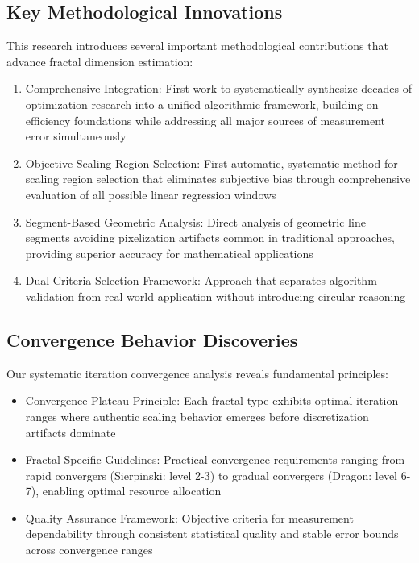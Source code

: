 \documentclass[preprint,12pt]{elsarticle}
\def\textbf#1{#1}%
\begin{document}
\subsection{Key Methodological Innovations}

This research introduces several important methodological contributions that advance fractal dimension estimation:

\begin{enumerate}
\item \textbf{Comprehensive Integration}: First work to systematically synthesize decades of optimization research into a unified algorithmic framework, building on efficiency foundations while addressing all major sources of measurement error simultaneously

\item \textbf{Objective Scaling Region Selection}: First automatic, systematic method for scaling region selection that eliminates subjective bias through comprehensive evaluation of all possible linear regression windows

\item \textbf{Segment-Based Geometric Analysis}: Direct analysis of geometric line segments avoiding pixelization artifacts common in traditional approaches, providing superior accuracy for mathematical applications

\item \textbf{Dual-Criteria Selection Framework}: Approach that separates algorithm validation from real-world application without introducing circular reasoning
\end{enumerate}

\subsection{Convergence Behavior Discoveries}

Our systematic iteration convergence analysis reveals fundamental principles:

\begin{itemize}
\item \textbf{Convergence Plateau Principle}: Each fractal type exhibits optimal iteration ranges where authentic scaling behavior emerges before discretization artifacts dominate

\item \textbf{Fractal-Specific Guidelines}: Practical convergence requirements ranging from rapid convergers (Sierpinski: level 2-3) to gradual convergers (Dragon: level 6-7), enabling optimal resource allocation

\item \textbf{Quality Assurance Framework}: Objective criteria for measurement dependability through consistent statistical quality and stable error bounds across convergence ranges
\end{itemize}
\end{document}
